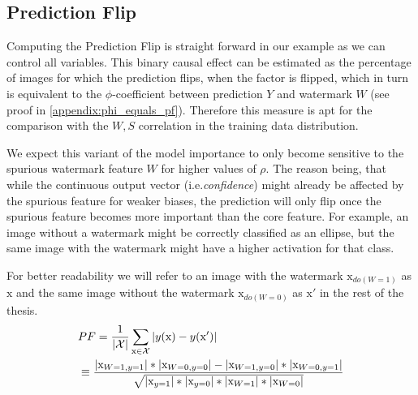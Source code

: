 \subsection{Prediction Flip}
Computing the Prediction Flip is straight forward in our example as we can control all variables. 
This binary causal effect can be estimated as the percentage of images for which the prediction flips, when the factor is flipped, which in turn is equivalent to the $\phi$-coefficient between prediction $Y$ and watermark $W$ (see proof in \cref{appendix:phi_equals_pf}). Therefore this measure is apt for the comparison with the $W,S$ correlation in the training data distribution.

We expect this variant of the model importance to only become sensitive to the spurious watermark feature $W$ for higher values of $\rho$. The reason being, that while the continuous output vector (i.e.\textit{confidence}) might already be affected by the spurious feature for weaker biases, the prediction will only flip once the spurious feature becomes more important than the core feature. For example, an image without a watermark might be correctly classified as an ellipse, but the same image with the watermark might have a higher activation for that class.

For better readability we will refer to an image with the watermark $\mathrm{x}_{do(W=1)}$ as $\mathrm{x}$ and the same image without the watermark $\mathrm{x}_{do(W=0)}$ as $\mathrm{x}'$ in the rest of the thesis.
\begin{align}
\displaystyle 
& PF =\frac{1}{|\mathcal{X}|} \sum_{\mathrm{x} \in \mathcal{X}} |y(\mathrm{x}) - y(\mathrm{x}') | \\
&  \equiv \frac{|\mathrm{x}_{W=1,y=1}|*|\mathrm{x}_{W=0,y=0}| - |\mathrm{x}_{W=1,y=0}|*|\mathrm{x}_{W=0,y=1}| }
{\sqrt{|\mathrm{x}_{y=1}|*|\mathrm{x}_{y=0}|*|\mathrm{x}_{W=1}|*|\mathrm{x}_{W=0}| }}
\end{align}


